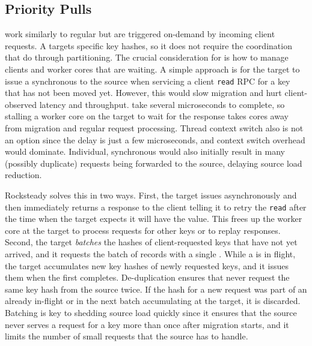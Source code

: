 
\subsection{Priority Pulls}
\label{sec:priopulls}

\priopulls work similarly to regular \pulls but are triggered on-demand by
incoming client requests. A \priopull targets specific key hashes, so it
does not require the coordination that \pulls do through partitioning.
The crucial consideration for \priopulls is how to manage clients and worker
cores that are waiting. A simple approach is for the target to issue a
synchronous \priopull to
the source when servicing a client \texttt{read} RPC for a key that has
not been
moved yet. However, this would slow migration and hurt client-observed latency
and throughput. \priopulls take several microseconds to complete, so stalling a
worker core on the target to wait for the response takes cores away from
migration and regular request processing. Thread context switch also is not an
option since the delay is just a few microseconds, and context switch overhead
would dominate.  Individual, synchronous \priopulls would also initially result
in many (possibly duplicate) requests being forwarded to the source, delaying
source load reduction.

Rocksteady solves this in two ways. First, the target issues \priopulls
asynchronously and then immediately returns a response to the client telling it to
retry the \texttt{read} after the time when the target expects it will have the
value. This frees up the worker core at the target to process requests for
other keys or to replay \pull responses. Second, the target {\em batches} the
hashes of client-requested keys that have not yet arrived, and it
requests the batch of records with a single \priopull. While a
\priopull is in flight, the target accumulates new key hashes of newly
requested keys, and it issues them when the first \priopull completes.
De-duplication ensures that \priopulls never request the same key hash
from the source twice. If the hash for a new request was part of an already in-flight \priopull
or in the next batch accumulating at the target, it is
discarded.  Batching is key to shedding source load quickly since it ensures
that the source never serves a request for a key more than once after migration
starts, and it limits the number of small requests that the source has to
handle.

